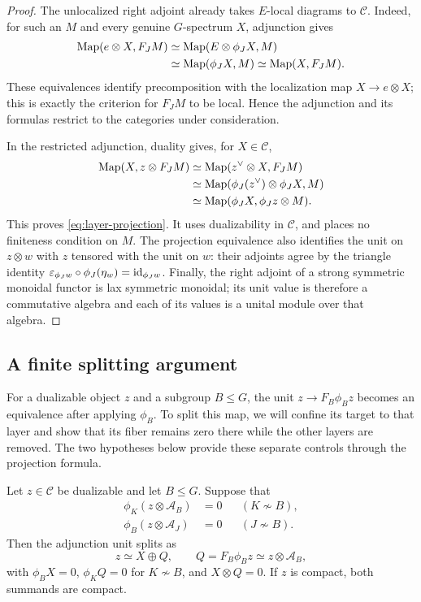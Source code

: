 \begin{proof}
The unlocalized right adjoint already takes \(E\)-local diagrams to
\(\mathcal C\). Indeed, for such an \(M\) and every genuine \(G\)-spectrum
\(X\), adjunction gives
\begin{align*}
 \operatorname{Map}(e\otimes X,F_JM)
 &\simeq\operatorname{Map}(E\otimes\phi_JX,M)\\
 &\simeq\operatorname{Map}(\phi_JX,M)
 \simeq\operatorname{Map}(X,F_JM).
\end{align*}
These equivalences identify precomposition with the localization map
\(X\to e\otimes X\); this is exactly the criterion for \(F_JM\) to be
local. Hence the adjunction and its formulas restrict to the categories
under consideration.

In the restricted adjunction, duality gives, for \(X\in\mathcal C\),
\begin{align*}
 \operatorname{Map}(X,z\otimes F_JM)
 &\simeq\operatorname{Map}(z^\vee\otimes X,F_JM)\\
 &\simeq\operatorname{Map}(\phi_J(z^\vee)\otimes\phi_JX,M)\\
 &\simeq\operatorname{Map}(\phi_JX,\phi_Jz\otimes M).
\end{align*}
This proves \eqref{eq:layer-projection}. It uses dualizability in
\(\mathcal C\), and places no finiteness condition on \(M\).
The projection equivalence also identifies the unit on \(z\otimes w\)
with \(z\) tensored with the unit on \(w\): their adjoints agree by the
triangle identity
\(\varepsilon_{\phi_Jw}\circ\phi_J(\eta_w)=\mathrm{id}_{\phi_Jw}\).
Finally,
the right adjoint of a strong symmetric monoidal functor is lax symmetric
monoidal; its unit value is therefore a commutative algebra and each of its
values is a unital module over that algebra.
\end{proof}

\subsection{A finite splitting argument}

For a dualizable object \(z\) and a subgroup \(B\le G\), the unit
\(z\to F_B\phi_Bz\) becomes an equivalence after applying \(\phi_B\).
To split this map, we will confine its target to that layer and show
that its fiber remains zero there while the other layers are removed.
The two hypotheses below provide these separate controls through the
projection formula.

\begin{lemma}\label{lem:layer-splitting}
Let \(z\in\mathcal C\) be dualizable and let \(B\le G\). Suppose that
\begin{align}
 \phi_K(z\otimes \mathcal A_B)&=0 &&(K\not\sim B),\label{eq:outgoing-orthogonality}\\
 \phi_B(z\otimes \mathcal A_J)&=0 &&(J\not\sim B).\label{eq:incoming-orthogonality}
\end{align}
Then the adjunction unit splits as
\[
 z\simeq X\oplus Q,\qquad Q=F_B\phi_Bz\simeq z\otimes \mathcal A_B,
\]
with \(\phi_BX=0\), \(\phi_KQ=0\) for \(K\not\sim B\), and
\(X\otimes Q=0\). If \(z\) is compact, both summands are compact.
\end{lemma}

